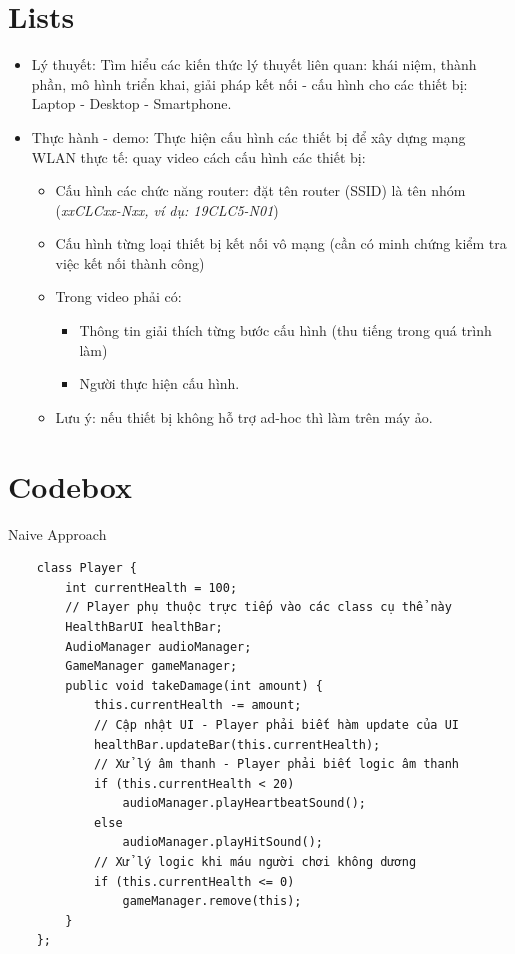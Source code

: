 \section{Lists}

\begin{itemize}[topsep=0pt, itemsep=2.5pt, leftmargin=1.5cm]
    \item Lý thuyết: Tìm hiểu các kiến thức lý thuyết liên quan: khái niệm, thành phần, mô hình triển khai, giải pháp kết nối - cấu hình cho các thiết bị: Laptop - Desktop - Smartphone.
    \item Thực hành - demo: Thực hiện cấu hình các thiết bị để xây dựng mạng WLAN thực tế: quay video cách cấu hình các thiết bị:

    \begin{itemize}[label=, leftmargin=1.5cm]
        \item Cấu hình các chức năng router: đặt tên router (SSID) là tên nhóm (\textit{xxCLCxx-Nxx, ví dụ: 19CLC5-N01})
        \item Cấu hình từng loại thiết bị kết nối vô mạng (cần có minh chứng kiểm tra việc kết nối thành công)
        \item Trong video phải có:

        \begin{itemize}[label=, leftmargin=1.5cm]
            \item Thông tin giải thích từng bước cấu hình (thu tiếng trong quá trình làm)
            \item Người thực hiện cấu hình.
        \end{itemize}
        \item Lưu ý: nếu thiết bị không hỗ trợ ad-hoc thì làm trên máy ảo.
    \end{itemize}
\end{itemize}

\newpage

\section{Codebox}

\begin{codebox}[naiveSolution]{Naive Approach}
    \begin{verbatim}
    class Player {
        int currentHealth = 100;
        // Player phụ thuộc trực tiếp vào các class cụ thể này
        HealthBarUI healthBar;
        AudioManager audioManager;
        GameManager gameManager;
        public void takeDamage(int amount) {
            this.currentHealth -= amount;
            // Cập nhật UI - Player phải biết hàm update của UI
            healthBar.updateBar(this.currentHealth);
            // Xử lý âm thanh - Player phải biết logic âm thanh
            if (this.currentHealth < 20)
                audioManager.playHeartbeatSound();
            else
                audioManager.playHitSound();
            // Xử lý logic khi máu người chơi không dương
            if (this.currentHealth <= 0)
                gameManager.remove(this);
        }
    };
    \end{verbatim}
\end{codebox}

